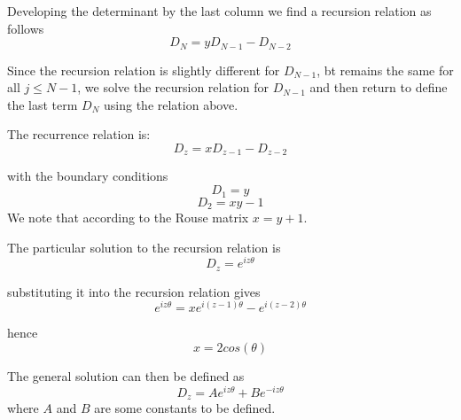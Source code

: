 \documentclass[12pt]{report}
\begin{document}
Developing the determinant by the last column we find a recursion relation as follows 
\begin{equation*}
D_N = yD_{N-1}-D_{N-2}
\end{equation*}

Since the recursion relation is slightly different for $D_{N-1}$, bt remains the same for all $j\leq N-1$, we solve the recursion relation for $D_{N-1}$ and then return to define the last term $D_N$ using the relation above. 

The recurrence relation is:
\begin{equation*}
D_z = xD_{z-1}-D_{z-2}
\end{equation*}

with the boundary conditions
\begin{equation*}
D_1 = y 
\end{equation*}
\begin{equation*}
D_2 = xy-1
\end{equation*}
We note that according to the Rouse matrix $x=y+1$.

The particular solution to the recursion relation is 
\begin{equation*}
D_z=e^{iz\theta}
\end{equation*}

substituting it into the recursion relation gives
\begin{equation*}
e^{iz\theta}=xe^{i(z-1)\theta}-e^{i(z-2)\theta}
\end{equation*}

hence
\begin{equation*}
x=2cos(\theta)
\end{equation*}

The general solution can then be defined as 
\begin{equation*}
D_z=Ae^{iz\theta}+Be^{-iz\theta}
\end{equation*}
where $A$ and $B$ are some constants to be defined.
\end{document}
